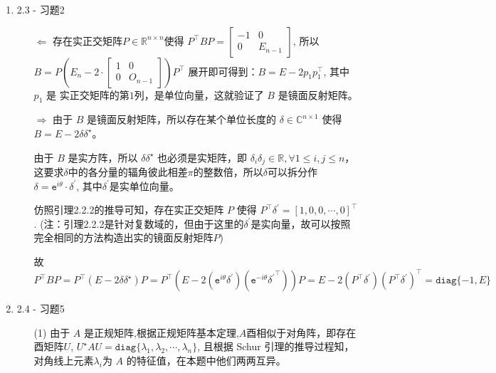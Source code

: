 \documentclass{article}
\begin{document}
\begin{spacing}{1.5}
\begin{enumerate}
    \item 2.3 - 习题2
    
    \begin{itemize}
        \item [$\Leftarrow$]
            存在实正交矩阵$P\in\mathbb{R}^{n\times n}$使得 $P^\top BP = \left[\begin{array}{cc}-1&0\\0&E_{n-1}\end{array}\right]$, 所以 
            $B = P\left(E_n - 2\cdot\left[\begin{array}{cc}1&0\\0&O_{n-1}\end{array}\right]\right)P^\top$ 展开即可得到：$B = E - 2p_1p_1^\top$, 其中 $p_1$ 是
            实正交矩阵的第$1$列，是单位向量，这就验证了 $B$ 是镜面反射矩阵。
        \item [$\Rightarrow$] 由于 $B$ 是镜面反射矩阵，所以存在某个单位长度的 $\delta\in\mathbb{C}^{n\times 1}$ 使得 $B = E - 2\delta\delta^\star$。
        
        由于 $B$ 是实方阵，所以 $\delta\delta^\star$ 
        也必须是实矩阵，即 $\delta_i\delta_j\in\mathbb{R},\forall 1\leq i,j \leq n$，这要求$\delta$中的各分量的辐角彼此相差$\pi$的整数倍，所以$\delta$可以拆分作 $\delta=\mathtt{e}^{i\theta}\cdot \delta^\prime$,
        其中$\delta^\prime$是实单位向量。

        仿照引理2.2.2的推导可知，存在实正交矩阵 $P$ 使得 $P^\top\delta^\prime = \left[1, 0, 0, \cdots, 0\right]^\top$. (注：引理2.2.2是针对复数域的，但由于这里的$\delta^\prime$是实向量，故可以按照完全相同的方法构造出实的镜面反射矩阵$P$)
        
        故 $P^\top B P = P^\top(E-2\delta\delta^\star)P = P^\top \left(E - 2(\mathtt{e}^{i\theta}\delta^\prime)(\mathtt{e}^{-i\theta}{\delta^\prime}^\top)\right)P = E - 2(P^\top\delta^\prime)(P^\top\delta^\prime)^\top = \mathtt{diag}\{-1, E\}$

    \end{itemize}

    \item 2.4 - 习题5
    
    \begin{itemize}
        \item [(1)]由于 $A$ 是正规矩阵,根据正规矩阵基本定理,$A$酉相似于对角阵，即存在酉矩阵$U$, $U^\star A U = \mathtt{diag}\{\lambda_1, \lambda_2, \cdots, \lambda_n\}$, 且根据 Schur 引理的推导过程知，对角线上元素$\lambda_i$为 $A$ 的特征值，在本题中他们两两互异。


\end{itemize}
\end{enumerate}
\end{spacing}
\end{document}
